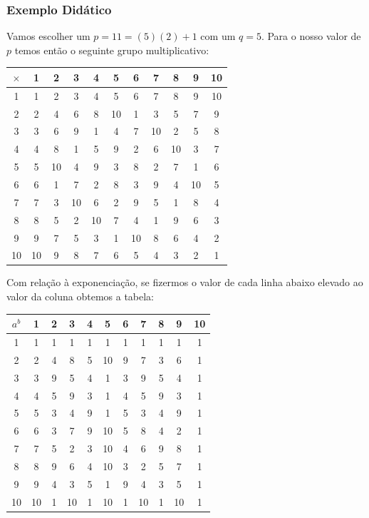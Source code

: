 \documentclass[a4paper]{article}
\begin{document}
      
    
    \subsubsection{Exemplo Didático}
    
    Vamos escolher um $p=11=(5)(2)+1$ com um $q=5$. Para o nosso valor de
    $p$ temos então o seguinte grupo multiplicativo:
    
    \begin{tabular}{|c||c|c|c|c|c|c|c|c|c|c|}
      \hline
    $\times$&1&2&3&4&5&6&7&8&9&10\\
      \hline
      \hline
    1&1&2&3&4&5&6&7&8&9&10\\
    \hline
    2&2&4&6&8&10&1&3&5&7&9\\
    \hline
    3&3&6&9&1&4&7&10&2&5&8\\
    \hline
    4&4&8&1&5&9&2&6&10&3&7\\
    \hline
    5&5&10&4&9&3&8&2&7&1&6\\
    \hline
    6&6&1&7&2&8&3&9&4&10&5\\
    \hline
    7&7&3&10&6&2&9&5&1&8&4\\
    \hline
    8&8&5&2&10&7&4&1&9&6&3\\
    \hline
    9&9&7&5&3&1&10&8&6&4&2\\
    \hline
    10&10&9&8&7&6&5&4&3&2&1\\
    \hline
    \end{tabular}
    
    Com relação à exponenciação, se fizermos o valor de cada linha abaixo
    elevado ao valor da coluna obtemos a tabela:
    
    \begin{tabular}{|c||c|c|c|c|c|c|c|c|c|c|}
      \hline
      $a^b$&1&2&3&4&5&6&7&8&9&10\\
      \hline
      \hline
    1&1&1&1&1&1&1&1&1&1&1\\
    \hline
    2&2&4&8&5&10&9&7&3&6&1\\
    \hline
    3&3&9&5&4&1&3&9&5&4&1\\
    \hline
    4&4&5&9&3&1&4&5&9&3&1\\
    \hline
    5&5&3&4&9&1&5&3&4&9&1\\
    \hline
    6&6&3&7&9&10&5&8&4&2&1\\
    \hline
    7&7&5&2&3&10&4&6&9&8&1\\
    \hline
    8&8&9&6&4&10&3&2&5&7&1\\
    \hline
    9&9&4&3&5&1&9&4&3&5&1\\
    \hline
    10&10&1&10&1&10&1&10&1&10&1\\
    \hline
    \end{tabular}
    
\end{document}
